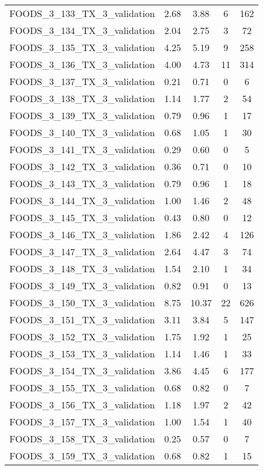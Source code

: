 \begin{table}
\begin{tabular}{|l|c|c|c|c|}
FOODS\_3\_133\_TX\_3\_validation & 2.68 & 3.88 & 6 & 162 \\
FOODS\_3\_134\_TX\_3\_validation & 2.04 & 2.75 & 3 & 72 \\
FOODS\_3\_135\_TX\_3\_validation & 4.25 & 5.19 & 9 & 258 \\
FOODS\_3\_136\_TX\_3\_validation & 4.00 & 4.73 & 11 & 314 \\
FOODS\_3\_137\_TX\_3\_validation & 0.21 & 0.71 & 0 & 6 \\
FOODS\_3\_138\_TX\_3\_validation & 1.14 & 1.77 & 2 & 54 \\
FOODS\_3\_139\_TX\_3\_validation & 0.79 & 0.96 & 1 & 17 \\
FOODS\_3\_140\_TX\_3\_validation & 0.68 & 1.05 & 1 & 30 \\
FOODS\_3\_141\_TX\_3\_validation & 0.29 & 0.60 & 0 & 5 \\
FOODS\_3\_142\_TX\_3\_validation & 0.36 & 0.71 & 0 & 10 \\
FOODS\_3\_143\_TX\_3\_validation & 0.79 & 0.96 & 1 & 18 \\
FOODS\_3\_144\_TX\_3\_validation & 1.00 & 1.46 & 2 & 48 \\
FOODS\_3\_145\_TX\_3\_validation & 0.43 & 0.80 & 0 & 12 \\
FOODS\_3\_146\_TX\_3\_validation & 1.86 & 2.42 & 4 & 126 \\
FOODS\_3\_147\_TX\_3\_validation & 2.64 & 4.47 & 3 & 74 \\
FOODS\_3\_148\_TX\_3\_validation & 1.54 & 2.10 & 1 & 34 \\
FOODS\_3\_149\_TX\_3\_validation & 0.82 & 0.91 & 0 & 13 \\
FOODS\_3\_150\_TX\_3\_validation & 8.75 & 10.37 & 22 & 626 \\
FOODS\_3\_151\_TX\_3\_validation & 3.11 & 3.84 & 5 & 147 \\
FOODS\_3\_152\_TX\_3\_validation & 1.75 & 1.92 & 1 & 25 \\
FOODS\_3\_153\_TX\_3\_validation & 1.14 & 1.46 & 1 & 33 \\
FOODS\_3\_154\_TX\_3\_validation & 3.86 & 4.45 & 6 & 177 \\
FOODS\_3\_155\_TX\_3\_validation & 0.68 & 0.82 & 0 & 7 \\
FOODS\_3\_156\_TX\_3\_validation & 1.18 & 1.97 & 2 & 42 \\
FOODS\_3\_157\_TX\_3\_validation & 1.00 & 1.54 & 1 & 40 \\
FOODS\_3\_158\_TX\_3\_validation & 0.25 & 0.57 & 0 & 7 \\
FOODS\_3\_159\_TX\_3\_validation & 0.68 & 0.82 & 1 & 15 \\

\end{tabular}
\end{table}

